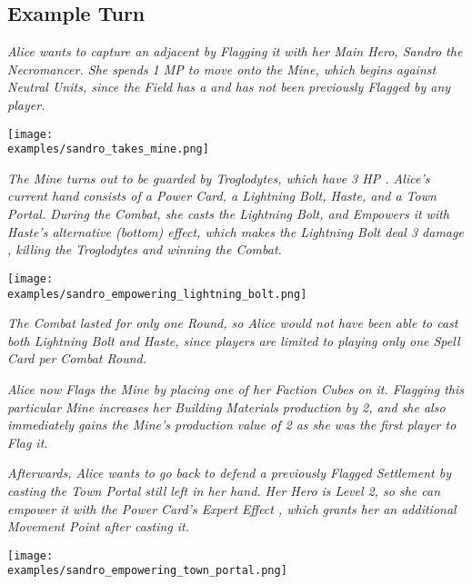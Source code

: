 \clearpage

\subsection*{Example Turn}

\begin{multicols*}{2}

\textit{Alice wants to capture an adjacent  by Flagging it with her Main Hero, Sandro the Necromancer.
    She spends 1 MP to move onto the Mine, which begins  against Neutral Units, since the Field has a  and has not been previously Flagged by any player.}\par

\texttt{[image: \\examples/sandro\_takes\_mine.png]}

\textit{The Mine turns out to be guarded by Troglodytes, which have 3 HP .
Alice's current hand consists of a Power Card, a Lightning Bolt, Haste, and a Town Portal.
During the Combat, she casts the Lightning Bolt, and Empowers  it with Haste's alternative (bottom) effect, which makes the Lightning Bolt deal 3 damage , killing the Troglodytes and winning the Combat.}

\texttt{[image: \\examples/sandro\_empowering\_lightning\_bolt.png]}

\columnbreak
\textit{The Combat lasted for only one Round, so Alice would not have been able to cast both Lightning Bolt and Haste, since players are limited to playing only one Spell Card per Combat Round.}\par


\textit{Alice now Flags the Mine by placing one of her Faction Cubes on it.
    Flagging this particular Mine increases her Building Materials  production by 2, and she also immediately gains the Mine's production value of 2  as she was the first player to Flag it.}\par
\textit{Afterwards, Alice wants to go back to defend a previously Flagged Settlement by casting the Town Portal still left in her hand.
    Her Hero is Level 2, so she can empower it with the Power Card's Expert Effect , which grants her an additional Movement Point after casting it.
}

\texttt{[image: \\examples/sandro\_empowering\_town\_portal.png]}


\end{multicols*}
